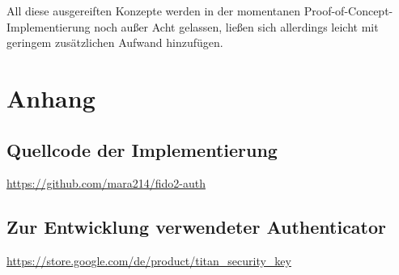 \documentclass[journal]{IEEEtran}
\begin{document}
All diese ausgereiften Konzepte werden in der momentanen
Proof-of-Concept-Implementierung noch außer Acht gelassen, ließen sich
allerdings leicht mit geringem zusätzlichen Aufwand hinzufügen.

\listoffigures

\nocite{*}




\section*{Anhang}

\subsection*{Quellcode der Implementierung}

\url{https://github.com/mara214/fido2-auth}

\subsection*{Zur Entwicklung verwendeter Authenticator}

\url{https://store.google.com/de/product/titan_security_key}
\end{document}
